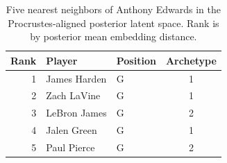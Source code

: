 \begin{table}[htbp]
  \centering\small
  \begin{tabular}{rllc}
    \toprule
    Rank & Player & Position & Archetype \\
    \midrule
    1 & James Harden & G & 1 \\
    2 & Zach LaVine & G & 1 \\
    3 & LeBron James & G & 2 \\
    4 & Jalen Green & G & 1 \\
    5 & Paul Pierce & G & 2 \\
    \bottomrule
  \end{tabular}
  \caption{Five nearest neighbors of Anthony Edwards in the Procrustes-aligned posterior latent space. Rank is by posterior mean embedding distance.}
  \label{tab:Anthony_Edwards_neighbors}
\end{table}

